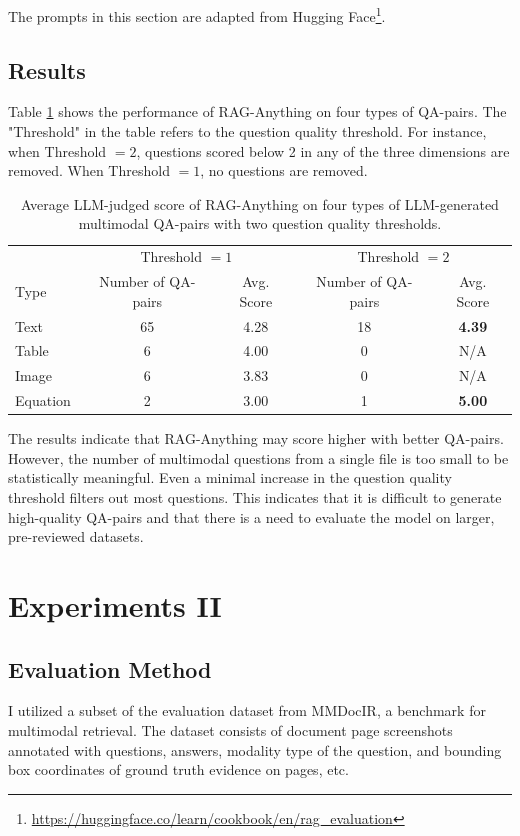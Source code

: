 \documentclass{article}
\begin{document}
  The prompts in this section are adapted from Hugging Face\footnote{\url{https://huggingface.co/learn/cookbook/en/rag_evaluation}}.

  \subsection{Results}
    Table \ref{tab:results1} shows the performance of RAG-Anything on four types of QA-pairs.
    The "Threshold" in the table refers to the question quality threshold.
    For instance, when Threshold $=2$, questions scored below 2 in any of the three dimensions are removed.
    When Threshold $=1$, no questions are removed.

    \begin{table}[ht]
        \centering
        \begin{tabular}{l|cc|cc}
        \toprule
        & \multicolumn{2}{c|}{Threshold $= 1$} & \multicolumn{2}{c}{Threshold $= 2$} \\
        Type   & Number of QA-pairs & Avg. Score & Number of QA-pairs & Avg. Score\\
        \midrule
            Text & 65 & 4.28 & 18 & \textbf{4.39}\\
            Table  & 6 & 4.00 & 0 & N/A\\
            Image & 6 & 3.83 & 0 & N/A\\
            Equation & 2 & 3.00 & 1 & \textbf{5.00}\\
        \bottomrule
        \end{tabular}
        \vspace{12pt}
        \caption{Average LLM-judged score of RAG-Anything on four types of LLM-generated multimodal QA-pairs with two question quality thresholds.}
        \label{tab:results1}
    \end{table}

    The results indicate that RAG-Anything may score higher with better QA-pairs.
    However, the number of multimodal questions from a single file is too small to be statistically meaningful.
    Even a minimal increase in the question quality threshold filters out most questions.
    This indicates that it is difficult to generate high-quality QA-pairs and that there is a need to evaluate the model on larger, pre-reviewed datasets.

\section{Experiments II}
  \subsection{Evaluation Method}
  I utilized a subset of the evaluation dataset from MMDocIR\cite{dong2025mmdocirbenchmarkingmultimodalretrieval}, a benchmark for multimodal retrieval.
  The dataset consists of document page screenshots annotated with questions, answers, modality type of the question, and bounding box coordinates of ground truth evidence on pages, etc.
  
\end{document}
